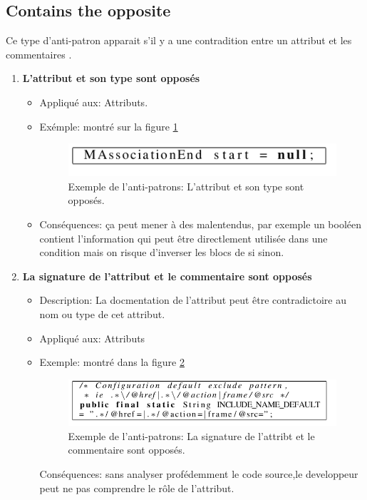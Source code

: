 \subsection{Contains the opposite}
Ce type d'anti-patron apparait s'il y a une contradition entre un attribut et les commentaires \cite{arnaoudova2013new}.
\begin{enumerate}
    

\item \textbf{L’attribut et son type sont opposés}
\begin{itemize}
\item Appliqué aux: Attributs.
\item Exémple: montré sur la figure \ref{fig:six_un}
\begin{figure}[H]
	\centering
\includegraphics[width=0.9\linewidth]{Others/Resources/six_un.png}
	\caption{Exemple de l'anti-patrons: L’attribut et son type sont opposés\cite{arnaoudova2013new}.}
		\label{fig:six_un}
	\end{figure}
\item Conséquences: ça peut mener à des malentendus, par exemple
un booléen contient l’information qui peut être directlement utilisée dans une condition mais on risque d’inverser les blocs de si sinon.
\end{itemize}
\item \textbf{La signature de l’attribut et le commentaire sont opposés}
\begin{itemize}
\item Description: La docmentation de l’attribut peut être contradictoire au nom ou type de cet attribut.
\item Appliqué aux: Attributs
\item Exemple: montré dans la figure \ref{fig:six_deux}
\begin{figure}[H]
	\centering
\includegraphics[width=0.9\linewidth]{Others/Resources/six_deux.png}
	\caption{Exemple de l'anti-patrons: La signature de l’attribt et le commentaire sont opposés\cite{arnaoudova2013new}.}
		\label{fig:six_deux}
	\end{figure}
\tem Conséquences: sans analyser profédemment le code source,le developpeur peut ne pas comprendre le rôle de l’attribut.
\end{itemize}

\end{enumerate}


